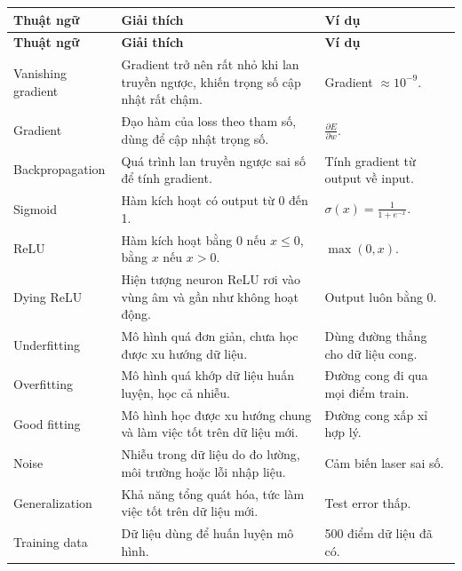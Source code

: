 \documentclass[12pt,a4paper]{report}
\begin{document}
\small
\begin{longtable}{p{}p{}p{}}
\toprule
\textbf{Thuật ngữ} & \textbf{Giải thích} & \textbf{Ví dụ} \\
\midrule
\endfirsthead

\toprule
\textbf{Thuật ngữ} & \textbf{Giải thích} & \textbf{Ví dụ} \\
\midrule
\endhead

Vanishing gradient & Gradient trở nên rất nhỏ khi lan truyền ngược, khiến trọng số cập nhật rất chậm. & Gradient $\approx 10^{-9}$. \\

Gradient & Đạo hàm của loss theo tham số, dùng để cập nhật trọng số. & $\frac{\partial E}{\partial w}$. \\

Backpropagation & Quá trình lan truyền ngược sai số để tính gradient. & Tính gradient từ output về input. \\

Sigmoid & Hàm kích hoạt có output từ 0 đến 1. & $\sigma(x)=\frac{1}{1+e^{-x}}$. \\

ReLU & Hàm kích hoạt bằng 0 nếu $x\leq 0$, bằng $x$ nếu $x>0$. & $\max(0,x)$. \\

Dying ReLU & Hiện tượng neuron ReLU rơi vào vùng âm và gần như không hoạt động. & Output luôn bằng 0. \\

Underfitting & Mô hình quá đơn giản, chưa học được xu hướng dữ liệu. & Dùng đường thẳng cho dữ liệu cong. \\

Overfitting & Mô hình quá khớp dữ liệu huấn luyện, học cả nhiễu. & Đường cong đi qua mọi điểm train. \\

Good fitting & Mô hình học được xu hướng chung và làm việc tốt trên dữ liệu mới. & Đường cong xấp xỉ hợp lý. \\

Noise & Nhiễu trong dữ liệu do đo lường, môi trường hoặc lỗi nhập liệu. & Cảm biến laser sai số. \\

Generalization & Khả năng tổng quát hóa, tức làm việc tốt trên dữ liệu mới. & Test error thấp. \\

Training data & Dữ liệu dùng để huấn luyện mô hình. & 500 điểm dữ liệu đã có. \\


\end{longtable}
\end{document}

